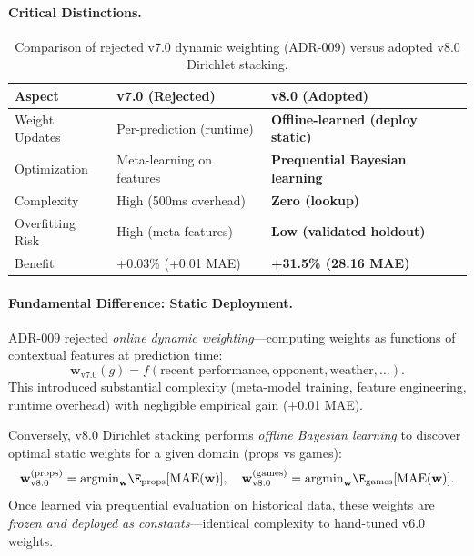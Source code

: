 \paragraph{Critical Distinctions.}
\begin{table}[h]
\centering
\caption[ADR-009 dynamic weights vs v8.0 Dirichlet comparison]{Comparison of rejected v7.0 dynamic weighting (ADR-009) versus adopted v8.0 Dirichlet stacking.}
\label{tab:adr009-vs-dirichlet}
\begin{tabular}{@{}lll@{}}
\toprule
\textbf{Aspect} & \textbf{v7.0 (Rejected)} & \textbf{v8.0 (Adopted)} \\
\midrule
Weight Updates & Per-prediction (runtime) & \textbf{Offline-learned (deploy static)} \\
Optimization & Meta-learning on features & \textbf{Prequential Bayesian learning} \\
Complexity & High (500ms overhead) & \textbf{Zero (lookup)} \\
Overfitting Risk & High (meta-features) & \textbf{Low (validated holdout)} \\
Benefit & +0.03\% (+0.01 MAE) & \textbf{+31.5\% (28.16 MAE)} \\
\bottomrule
\end{tabular}
\end{table}

\paragraph{Fundamental Difference: Static Deployment.}
ADR-009 rejected \emph{online dynamic weighting}---computing weights as functions of contextual features at prediction time:
\begin{equation}
\mathbf{w}_{\text{v7.0}}(g) = f(\text{recent performance}, \text{opponent}, \text{weather}, \ldots).
\end{equation}
This introduced substantial complexity (meta-model training, feature engineering, runtime overhead) with negligible empirical gain (+0.01 MAE).

Conversely, v8.0 Dirichlet stacking performs \emph{offline Bayesian learning} to discover optimal static weights for a given domain (props vs games):
\begin{equation}
\mathbf{w}_{\text{v8.0}}^{\text{(props)}} = \text{argmin}_{\mathbf{w}} \E_{\text{props}}[\text{MAE}(\mathbf{w})], \quad \mathbf{w}_{\text{v8.0}}^{\text{(games)}} = \text{argmin}_{\mathbf{w}} \E_{\text{games}}[\text{MAE}(\mathbf{w})].
\end{equation}
Once learned via prequential evaluation on historical data, these weights are \emph{frozen and deployed as constants}---identical complexity to hand-tuned v6.0 weights.

